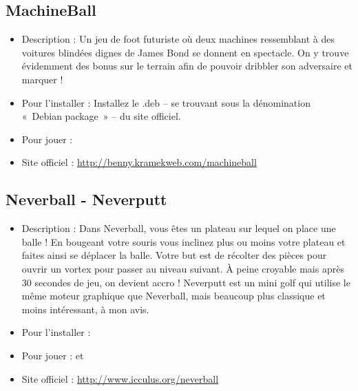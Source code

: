 \subsection{MachineBall}
\begin{itemize}
\begingroup
{}
\item Description : Un jeu de foot futuriste où deux machines ressemblant à des voitures blindées dignes de James Bond se donnent en spectacle. On y trouve évidemment des bonus sur le terrain afin de pouvoir dribbler son adversaire et marquer !{\par}
\endgroup
\item Pour l'installer : Installez le .deb -- se trouvant sous la dénomination «~Debian package~» -- du site officiel.{\par}
\item Pour jouer : 
\item Site officiel : \url{http://benny.kramekweb.com/machineball}{\par}
\end{itemize}
\subsection{Neverball - Neverputt}
\begin{itemize}
\begingroup
{}
\item Description : Dans Neverball, vous êtes un plateau sur lequel on place une balle ! En bougeant votre souris vous inclinez plus ou moins votre plateau et faites ainsi se déplacer la balle. Votre but est de récolter des pièces pour ouvrir un vortex pour passer au niveau suivant. À peine croyable mais après 30 secondes de jeu, on devient accro ! Neverputt est un mini golf qui utilise le même moteur graphique que Neverball, mais beaucoup plus classique et moins intéressant, à mon avis.{\par}
\item Pour l'installer : 
\item Pour jouer :  et 
\item Site officiel : \url{http://www.icculus.org/neverball}{\par}
\endgroup
\end{itemize}
